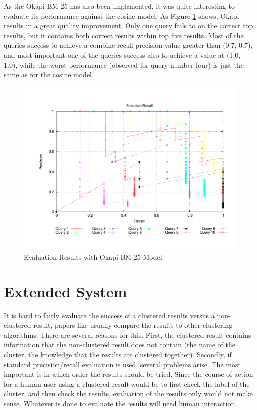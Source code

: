 As the Okapi BM-25 has also been implemented, it was quite interesting to evaluate its performance against the cosine model. As Figure \ref{fig:okapi} shows, Okapi results in a great quality improvement. Only one query fails to on the correct top results, but it contains both correct results within top five results. Most of the queries success to achieve a combine recall-precision value greater than (0.7, 0.7), and most important one of the queries success also to achieve a value at (1.0, 1.0), while the worst performance (observed for query number four) is just the same as for the cosine model.

\begin{figure}
\includegraphics[width=1.0\textwidth]{include/bench_okapi}
\caption{Evaluation Results with Okapi BM-25 Model}
\label{fig:okapi}
\end{figure}

\section{Extended System}

It is hard to fairly evaluate the success of a clustered results versus a non-clustered result, papers like \cite{zamir} usually compare the results to other clustering algorithms. There are several reasons for this. First, the clustered result contains information that the non-clustered result does not contain (the name of the cluster, the knowledge that the results are clustered together). Secondly, if standard precision/recall evaluation is used, several problems arise. The most important is in which order the results should be tried. Since the course of action for a human user using a clustered result would be to first check the label of the cluster, and then check the results, evaluation of the results only would not make sense. Whatever is done to evaluate the results will need human interaction. 

